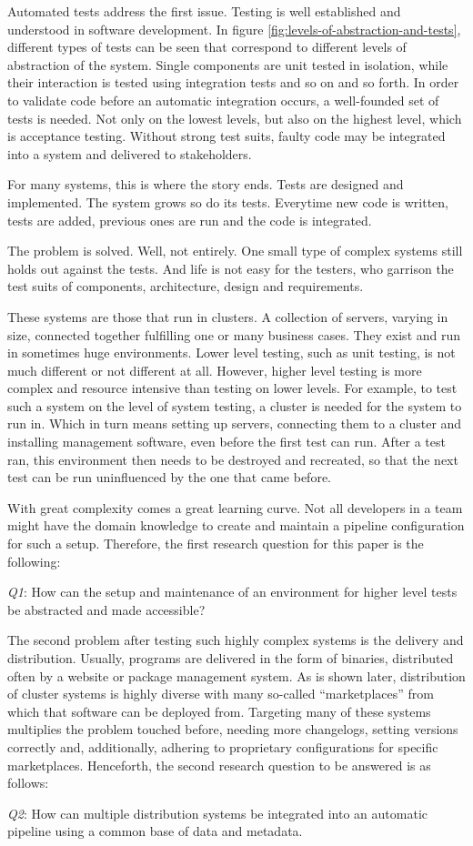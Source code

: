 Automated tests address the first issue.
Testing is well established and understood in software development.
In figure \ref{fig:levels-of-abstraction-and-tests}, different types of tests can be seen that correspond to different levels of abstraction of the system.
Single components are unit tested in isolation, while their interaction is tested using integration tests and so on and so forth.
In order to validate code before an automatic integration occurs, a well-founded set of tests is needed.
Not only on the lowest levels, but also on the highest level, which is acceptance testing.
Without strong test suits,  faulty code may be integrated into a system and delivered to stakeholders.

For many systems, this is where the story ends.
Tests are designed and implemented.
The system grows so do its tests.
Everytime new code is written, tests are added, previous ones are run and the code is integrated.

The problem is solved.
Well, not entirely.
One small type of complex systems still holds out against the tests.
And life is not easy for the testers, who garrison the test suits of components, architecture, design and requirements\cite{AsterixBeginningSentence}.

These systems are those that run in clusters.
A collection of servers, varying in size, connected together fulfilling one or many business cases.
They exist and run in sometimes huge environments.
Lower level testing, such as unit testing, is not much different or not different at all.
However, higher level testing is more complex and resource intensive than testing on lower levels.
For example, to test such a system on the level of system testing, a cluster is needed for the system to run in.
Which in turn means setting up servers, connecting them to a cluster and installing management software, even before the first test can run.
After a test ran, this environment then needs to be destroyed and recreated, so that the next test can be run uninfluenced by the one that came before.

With great complexity comes a great learning curve.
Not all developers in a team might have the domain knowledge to create and maintain a pipeline configuration for such a setup.
Therefore, the first research question for this paper is the following:

\textit{Q1}: How can the setup and maintenance of an environment for higher level tests be abstracted and made accessible?

The second problem after testing such highly complex systems is the delivery and distribution.
Usually, programs are delivered in the form of binaries, distributed often by a website or package management system.
As is shown later, distribution of cluster systems is highly diverse with many so-called ``marketplaces'' from which that software can be deployed from.
Targeting many of these systems multiplies the problem touched before, needing more changelogs, setting versions correctly and, additionally, adhering to proprietary configurations for specific marketplaces.
Henceforth, the second research question to be answered is as follows:

\textit{Q2}: How can multiple distribution systems be integrated into an automatic pipeline using a common base of data and metadata.

